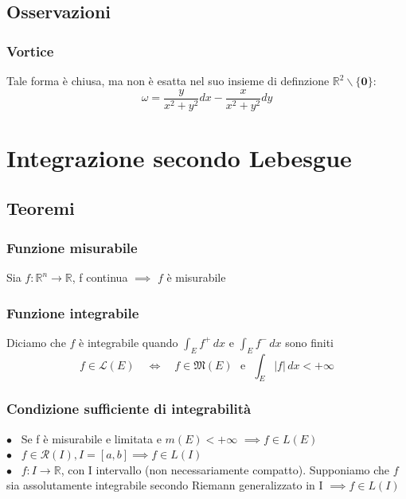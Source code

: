 \documentclass{article} %
\begin{document}
    \subsection{Osservazioni}
    \subsubsection*{Vortice}
    Tale forma è chiusa, ma non è esatta nel suo insieme di definzione $\mathbb{R}^2 \backslash \{\mathbf{0}\}$:
    $$\omega = \frac{y}{x^2+y^2} dx - \frac{x}{x^2 + y^2}dy$$
    



    \section{Integrazione secondo Lebesgue}
    \subsection{Teoremi}
    \subsubsection*{Funzione misurabile}
    Sia $f:\mathbb{R} ^n \to \mathbb{R} $, f continua $\implies$ $f$ è misurabile  

    \subsubsection*{Funzione integrabile}
    Diciamo che $f$ è integrabile quando $\int_{E}^{ }f^+\,dx$ e $\int_{E}^{ }f^-\,dx$ sono finiti
    $$ f \in \mathcal{L} (E) \, \, \, \, \, \,  \Longleftrightarrow \, \, \, \, \, \,  f \in \mathfrak{M} (E) \,\, \, \,  \text{e} \,\, \, \,  \int_{E}^{ }|f|\,dx < +\infty  $$

    \subsubsection*{Condizione sufficiente di integrabilità}
    $\bullet$ \, Se f è misurabile e limitata e $m(E) < + \infty$ $\implies f \in L(E)$ \\
    $\bullet$ \, $f \in \mathcal{R} (I), I=[a,b] \implies f \in L(I)$ \\
    $\bullet$ \, $f: I \to \mathbb{R}$, con I intervallo (non necessariamente compatto). Supponiamo che $f$ sia assolutamente integrabile secondo Riemann generalizzato in I $\implies f \in L(I)$
\end{document}
